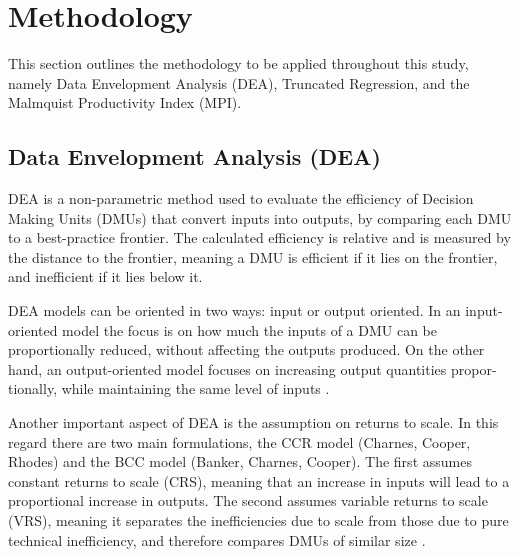 
\section{Methodology}
\label{sec:imple}
This section outlines the methodology to be applied throughout this study, namely Data Envelopment Analysis (DEA), Truncated Regression, and the Malmquist Productivity Index (MPI). 
\subsection{Data Envelopment Analysis (DEA)}
\label{dea}
DEA is a non-parametric method used to evaluate the efficiency of Decision Making Units (DMUs) that convert inputs into outputs, by comparing each DMU to a best-practice frontier. The calculated efficiency is relative and is
measured by the distance to the frontier, meaning a DMU is efficient if it lies on the frontier, and inefficient if it lies below it. 

DEA models can be oriented in two ways: input or output oriented. In an input-oriented model the focus is on how much the inputs of a DMU can be proportionally reduced, without affecting the outputs
produced. On the other hand, an output-oriented model focuses on increasing output quantities propor-
tionally, while maintaining the same level of inputs \cite{charnes1994}. 

Another important aspect of DEA is the assumption on returns to scale. In this regard there are two
main formulations, the CCR model (Charnes, Cooper, Rhodes) and the BCC model (Banker, Charnes,
Cooper). The first assumes constant returns to scale (CRS), meaning that an increase in inputs will lead to a proportional increase in outputs. The second assumes variable returns to scale (VRS), meaning it separates the inefficiencies due to scale from those due to pure technical inefficiency, and therefore compares DMUs of similar size \cite{banker1984}. 

